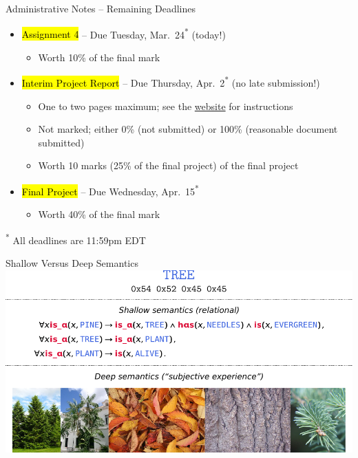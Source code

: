 \documentclass[handout,aspectratio=169]{beamer}
\begin{document}
	\begin{frame}{Administrative Notes -- Remaining Deadlines}
		\begin{itemize}
			\setlength{\itemsep}{0.5cm}
			\item \hl{Assignment 4} -- Due Tuesday, Mar.~24\textsuperscript{*} (today!)\\[0.125cm]
			\begin{itemize}
				\item Worth 10\% of the final mark
			\end{itemize}
			\item \hl{Interim Project Report} -- Due Thursday, Apr.~2\textsuperscript{*} (no late submission!)\\[0.125cm]
			\begin{itemize}
				\setlength{\itemsep}{0.125cm}
				\item One to two pages maximum; see the \href{https://raw.githubusercontent.com/astoeckel/syde556-w20/master/project/interim_report_template/syde556_project_interim_report_template.pdf}{website} for instructions
				\item Not marked; either 0\% (not submitted) or 100\% (reasonable document submitted)
				\item Worth 10 marks (25\% of the final project) of the final project
			\end{itemize}
			\item \hl{Final Project} -- Due Wednesday, Apr.~15\textsuperscript{*}\\[0.125cm]
			\begin{itemize}
				\item Worth 40\% of the final mark
			\end{itemize}
		\end{itemize}
		\vspace{0.5cm}
		{\footnotesize\color{aluminium4}\textsuperscript{*} All deadlines are 11:59pm EDT}
	\end{frame}

	\begin{frame}{Shallow Versus Deep Semantics}
		\includegraphics[width=\textwidth]{media/shallow_vs_deep_semantics.pdf}
	\end{frame}
\end{document}
